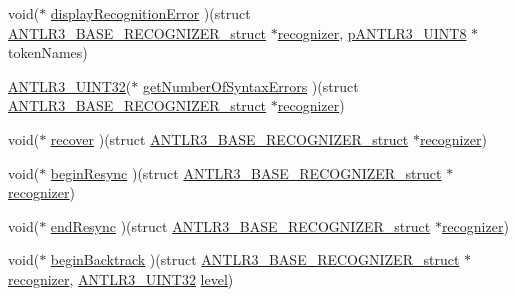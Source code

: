 \begin{DoxyCompactItemize}
\item 
void($\ast$ \hyperlink{struct_a_n_t_l_r3___b_a_s_e___r_e_c_o_g_n_i_z_e_r__struct_ab9e9f3d92b4a40a68a877c9689b60f99}{display\-Recognition\-Error} )(struct \hyperlink{struct_a_n_t_l_r3___b_a_s_e___r_e_c_o_g_n_i_z_e_r__struct}{A\-N\-T\-L\-R3\-\_\-\-B\-A\-S\-E\-\_\-\-R\-E\-C\-O\-G\-N\-I\-Z\-E\-R\-\_\-struct} $\ast$\hyperlink{struct_a_n_t_l_r3___b_a_s_e___r_e_c_o_g_n_i_z_e_r__struct_aa7ab273aa44860cea6cd6e41528b57af}{recognizer}, \hyperlink{antlr3defs_8h_a95c800abcac5d607fd9e3e775ace78c5}{p\-A\-N\-T\-L\-R3\-\_\-\-U\-I\-N\-T8} $\ast$token\-Names)
\item 
\hyperlink{antlr3defs_8h_ac41f744abd0fd25144b9eb9d11b1dfd1}{A\-N\-T\-L\-R3\-\_\-\-U\-I\-N\-T32}($\ast$ \hyperlink{struct_a_n_t_l_r3___b_a_s_e___r_e_c_o_g_n_i_z_e_r__struct_a1f5ee9670652b2e2240bbc59b51b11cc}{get\-Number\-Of\-Syntax\-Errors} )(struct \hyperlink{struct_a_n_t_l_r3___b_a_s_e___r_e_c_o_g_n_i_z_e_r__struct}{A\-N\-T\-L\-R3\-\_\-\-B\-A\-S\-E\-\_\-\-R\-E\-C\-O\-G\-N\-I\-Z\-E\-R\-\_\-struct} $\ast$\hyperlink{struct_a_n_t_l_r3___b_a_s_e___r_e_c_o_g_n_i_z_e_r__struct_aa7ab273aa44860cea6cd6e41528b57af}{recognizer})
\item 
void($\ast$ \hyperlink{struct_a_n_t_l_r3___b_a_s_e___r_e_c_o_g_n_i_z_e_r__struct_aed4f2b5b8c2d9c255e07bd32be9c3b88}{recover} )(struct \hyperlink{struct_a_n_t_l_r3___b_a_s_e___r_e_c_o_g_n_i_z_e_r__struct}{A\-N\-T\-L\-R3\-\_\-\-B\-A\-S\-E\-\_\-\-R\-E\-C\-O\-G\-N\-I\-Z\-E\-R\-\_\-struct} $\ast$\hyperlink{struct_a_n_t_l_r3___b_a_s_e___r_e_c_o_g_n_i_z_e_r__struct_aa7ab273aa44860cea6cd6e41528b57af}{recognizer})
\item 
void($\ast$ \hyperlink{struct_a_n_t_l_r3___b_a_s_e___r_e_c_o_g_n_i_z_e_r__struct_a20d026c8c4f6e0b5ba348fb67e90c07f}{begin\-Resync} )(struct \hyperlink{struct_a_n_t_l_r3___b_a_s_e___r_e_c_o_g_n_i_z_e_r__struct}{A\-N\-T\-L\-R3\-\_\-\-B\-A\-S\-E\-\_\-\-R\-E\-C\-O\-G\-N\-I\-Z\-E\-R\-\_\-struct} $\ast$\hyperlink{struct_a_n_t_l_r3___b_a_s_e___r_e_c_o_g_n_i_z_e_r__struct_aa7ab273aa44860cea6cd6e41528b57af}{recognizer})
\item 
void($\ast$ \hyperlink{struct_a_n_t_l_r3___b_a_s_e___r_e_c_o_g_n_i_z_e_r__struct_a7d9ce595456fe55916d36d9714011294}{end\-Resync} )(struct \hyperlink{struct_a_n_t_l_r3___b_a_s_e___r_e_c_o_g_n_i_z_e_r__struct}{A\-N\-T\-L\-R3\-\_\-\-B\-A\-S\-E\-\_\-\-R\-E\-C\-O\-G\-N\-I\-Z\-E\-R\-\_\-struct} $\ast$\hyperlink{struct_a_n_t_l_r3___b_a_s_e___r_e_c_o_g_n_i_z_e_r__struct_aa7ab273aa44860cea6cd6e41528b57af}{recognizer})
\item 
void($\ast$ \hyperlink{struct_a_n_t_l_r3___b_a_s_e___r_e_c_o_g_n_i_z_e_r__struct_a8824d8d6af86c2e6101faece32760894}{begin\-Backtrack} )(struct \hyperlink{struct_a_n_t_l_r3___b_a_s_e___r_e_c_o_g_n_i_z_e_r__struct}{A\-N\-T\-L\-R3\-\_\-\-B\-A\-S\-E\-\_\-\-R\-E\-C\-O\-G\-N\-I\-Z\-E\-R\-\_\-struct} $\ast$\hyperlink{struct_a_n_t_l_r3___b_a_s_e___r_e_c_o_g_n_i_z_e_r__struct_aa7ab273aa44860cea6cd6e41528b57af}{recognizer}, \hyperlink{antlr3defs_8h_ac41f744abd0fd25144b9eb9d11b1dfd1}{A\-N\-T\-L\-R3\-\_\-\-U\-I\-N\-T32} \hyperlink{_read_d_m3___matlab_8m_afde8e18a788ccc92fc61cab298bca7e3}{level})

\end{DoxyCompactItemize}
